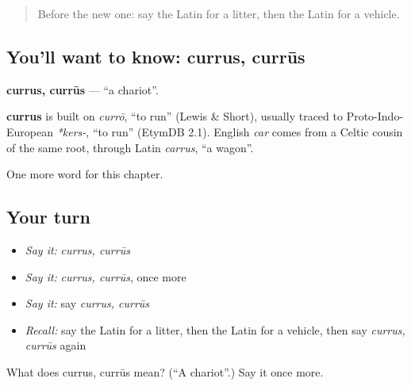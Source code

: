 \label{lesson:LA-C217-currus}



\begin{quote}
Before the new one: say the Latin for a litter, then the Latin for a vehicle.
\end{quote}

\subsection*{You'll want to know: currus, currūs}
\textbf{currus, currūs} — \textquotedblleft{}a chariot\textquotedblright{}.

\begin{cousinweb}
\textbf{currus} is built on \emph{currō}, \textquotedblleft{}to run\textquotedblright{} (Lewis \& Short), usually traced to Proto-Indo-European \emph{*kers-}, \textquotedblleft{}to run\textquotedblright{} (EtymDB 2.1). English \emph{car} comes from a Celtic cousin of the same root, through Latin \emph{carrus}, \textquotedblleft{}a wagon\textquotedblright{}.
\end{cousinweb}

\begin{grammarlens}[title={What you've built}]
One more word for this chapter.
\end{grammarlens}

\subsection*{Your turn}
\begin{itemize}
\raggedright
  \item \emph{Say it:} \emph{currus, currūs}
  \item \emph{Say it:} \emph{currus, currūs}, once more
  \item \emph{Say it:} say \emph{currus, currūs}
  \item \emph{Recall:} say the Latin for a litter, then the Latin for a vehicle, then say \emph{currus, currūs} again
\end{itemize}

\begin{tcolorbox}[breakable,colback=teal!4,colframe=teal!35!black,title={Before you move on}]
What does currus, currūs mean? (\textquotedblleft{}A chariot\textquotedblright{}.) Say it once more.
\end{tcolorbox}
